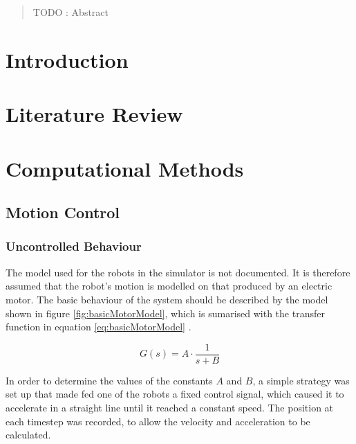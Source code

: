\documentclass[10pt,british,english]{article}
\begin{document}
%

\acresetall

\begin{abstract}
TODO : Abstract
\end{abstract}

\tableofcontents

\acresetall

\cleardoublepage

\section{Introduction}

\section{Literature Review}

\section{Computational Methods}

\subsection{Motion Control}

\subsubsection{Uncontrolled Behaviour}

The model used for the robots in the simulator is not documented. It is therefore assumed that the robot's motion is modelled on that produced by an electric motor. The basic behaviour of the system should be described by the model shown in figure \ref{fig:basicMotorModel}, which is sumarised with the transfer function in equation \ref{eq:basicMotorModel} \cite{basicControlNotes}.

\begin{equation}
 G\left(s\right) = A \cdot \frac{1}{s+B}
\end{equation}

In order to determine the values of the constants $A$ and $B$, a simple strategy was set up that made fed one of the robots a fixed control signal, which caused it to accelerate in a straight line until it reached a constant speed.  The position at each timestep was recorded, to allow the velocity and acceleration to be calculated.
\end{document}
